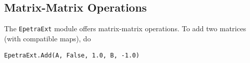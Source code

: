 \documentclass[10pt,relax]{SANDreport}
\begin{document}
\subsection{Matrix-Matrix Operations}

The {\tt EpetraExt} module offers matrix-matrix operations. To add two matrices
(with compatible maps), do
\begin{verbatim}
EpetraExt.Add(A, False, 1.0, B, -1.0)
\end{verbatim}



\end{document}
